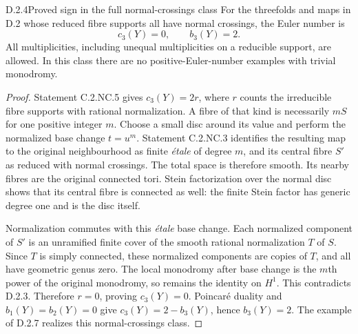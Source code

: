 \begin{idstatement}{D.2.4}{Proved sign in the full normal-crossings class}
\label{st:D.2.4}
For the threefolds and maps in D.2 whose reduced fibre supports
all have normal crossings, the Euler number is
\[
c_3(Y)=0,\qquad b_3(Y)=2.
\]
All multiplicities, including unequal multiplicities on a
reducible support, are allowed. In this class there are no
positive-Euler-number examples with trivial monodromy.
\end{idstatement}
\begin{proof}
Statement C.2.NC.5 gives $c_3(Y)=2r$, where $r$ counts the
irreducible fibre supports with rational normalization. A fibre
of that kind is necessarily $mS$ for one positive integer $m$.
Choose a small disc around its value and perform the normalized
base change $t=u^m$. Statement C.2.NC.3 identifies the resulting
map to the original neighbourhood as finite \emph{\'etale} of
degree $m$, and its central fibre $S'$ as reduced with normal
crossings. The total space is therefore smooth. Its nearby
fibres are the original connected tori. Stein factorization
over the normal disc shows that its central fibre is connected
as well: the finite Stein factor has generic degree one and is
the disc itself.

Normalization commutes with this \emph{\'etale} base change.
Each normalized component of $S'$ is an unramified finite cover
of the smooth rational normalization $T$ of $S$. Since $T$ is
simply connected, these normalized components are copies of
$T$, and all have geometric genus zero. The local monodromy
after base change is the $m$th power of the original monodromy,
so remains the identity on $H^1$. This contradicts D.2.3.
Therefore $r=0$, proving $c_3(Y)=0$. Poincar\'e duality and
$b_1(Y)=b_2(Y)=0$ give $c_3(Y)=2-b_3(Y)$, hence $b_3(Y)=2$.
The example of D.2.7 realizes this normal-crossings class.
\end{proof}



